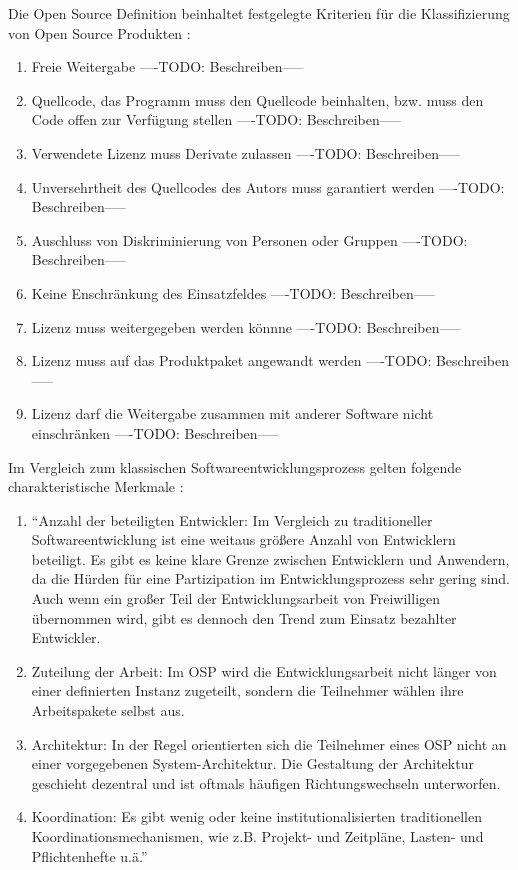 Die Open Source Definition beinhaltet festgelegte Kriterien für die Klassifizierung von Open Source Produkten \cite{suchen}:
\begin{enumerate}
\item Freie Weitergabe
----TODO: Beschreiben-----
\item Quellcode, das Programm muss den Quellcode beinhalten, bzw. muss den Code offen zur Verfügung stellen
----TODO: Beschreiben-----
\item Verwendete Lizenz muss Derivate zulassen
----TODO: Beschreiben-----
\item Unversehrtheit des Quellcodes des Autors muss garantiert werden
----TODO: Beschreiben-----
\item Auschluss von Diskriminierung von Personen oder Gruppen
----TODO: Beschreiben-----
\item Keine Enschränkung des Einsatzfeldes
----TODO: Beschreiben-----
\item Lizenz muss weitergegeben werden könnne
----TODO: Beschreiben-----
\item Lizenz muss auf das Produktpaket angewandt werden
----TODO: Beschreiben-----
\item Lizenz darf die Weitergabe zusammen mit anderer Software nicht einschränken
----TODO: Beschreiben-----
\end{enumerate}

Im Vergleich zum klassischen Softwareentwicklungsprozess gelten folgende charakteristische Merkmale \cite{suchen}:
\begin{enumerate}
\item “Anzahl der beteiligten Entwickler: Im Vergleich zu traditioneller Softwareentwicklung ist eine weitaus größere Anzahl von Entwicklern beteiligt. Es gibt es keine klare Grenze zwischen Entwicklern und Anwendern, da die Hürden für eine Partizipation im Entwicklungsprozess sehr gering sind. Auch wenn ein großer Teil der Entwicklungsarbeit von Freiwilligen übernommen wird, gibt es dennoch den Trend zum Einsatz bezahlter Entwickler.
\item Zuteilung der Arbeit: Im OSP wird die Entwicklungsarbeit nicht länger von einer definierten Instanz zugeteilt, sondern die Teilnehmer wählen ihre Arbeitspakete selbst aus.
\item Architektur: In der Regel orientierten sich die Teilnehmer eines OSP nicht an einer vorgegebenen System-Architektur. Die Gestaltung der Architektur geschieht dezentral und ist oftmals häufigen Richtungswechseln unterworfen.
\item Koordination: Es gibt wenig oder keine institutionalisierten traditionellen Koordinationsmechanismen, wie z.B. Projekt- und Zeitpläne, Lasten- und Pflichtenhefte u.ä.” \cite{suchen}
\end{enumerate}

